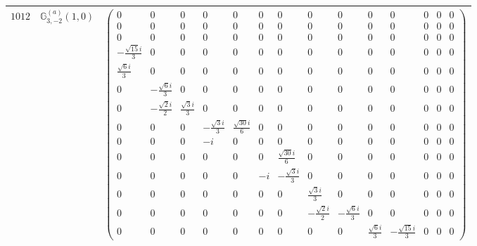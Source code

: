 \documentclass[fleqn,8pt,landscape]{jsarticle}
\begin{document}
\begin{center}
\begin{longtable}{ccc}
$ 1012 $ & $ \mathbb{G}_{3,-2}^{(a)}(1,0) $ & $ \begin{pmatrix} 0 & 0 & 0 & 0 & 0 & 0 & 0 & 0 & 0 & 0 & 0 & 0 & 0 & 0 \\ 0 & 0 & 0 & 0 & 0 & 0 & 0 & 0 & 0 & 0 & 0 & 0 & 0 & 0 \\ 0 & 0 & 0 & 0 & 0 & 0 & 0 & 0 & 0 & 0 & 0 & 0 & 0 & 0 \\ - \frac{\sqrt{15} i}{3} & 0 & 0 & 0 & 0 & 0 & 0 & 0 & 0 & 0 & 0 & 0 & 0 & 0 \\ \frac{\sqrt{6} i}{3} & 0 & 0 & 0 & 0 & 0 & 0 & 0 & 0 & 0 & 0 & 0 & 0 & 0 \\ 0 & - \frac{\sqrt{6} i}{3} & 0 & 0 & 0 & 0 & 0 & 0 & 0 & 0 & 0 & 0 & 0 & 0 \\ 0 & - \frac{\sqrt{2} i}{2} & \frac{\sqrt{3} i}{3} & 0 & 0 & 0 & 0 & 0 & 0 & 0 & 0 & 0 & 0 & 0 \\ 0 & 0 & 0 & - \frac{\sqrt{3} i}{3} & \frac{\sqrt{30} i}{6} & 0 & 0 & 0 & 0 & 0 & 0 & 0 & 0 & 0 \\ 0 & 0 & 0 & - i & 0 & 0 & 0 & 0 & 0 & 0 & 0 & 0 & 0 & 0 \\ 0 & 0 & 0 & 0 & 0 & 0 & \frac{\sqrt{30} i}{6} & 0 & 0 & 0 & 0 & 0 & 0 & 0 \\ 0 & 0 & 0 & 0 & 0 & - i & - \frac{\sqrt{3} i}{3} & 0 & 0 & 0 & 0 & 0 & 0 & 0 \\ 0 & 0 & 0 & 0 & 0 & 0 & 0 & \frac{\sqrt{3} i}{3} & 0 & 0 & 0 & 0 & 0 & 0 \\ 0 & 0 & 0 & 0 & 0 & 0 & 0 & - \frac{\sqrt{2} i}{2} & - \frac{\sqrt{6} i}{3} & 0 & 0 & 0 & 0 & 0 \\ 0 & 0 & 0 & 0 & 0 & 0 & 0 & 0 & 0 & \frac{\sqrt{6} i}{3} & - \frac{\sqrt{15} i}{3} & 0 & 0 & 0 \end{pmatrix} $ \\ \hline

\end{longtable}
\end{center}
\end{document}
